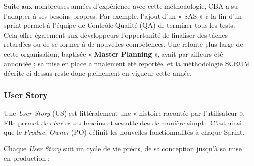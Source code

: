 \documentclass{article}
\begin{document}
Suite aux nombreuses années d'expérience avec cette méthodologie, CBA a su l'adapter à ses besoins propres. Par exemple, l'ajout d'un « SAS » à la fin d'un sprint permet à l'équipe de Contrôle Qualité (QA) de terminer tous les tests. Cela offre également aux développeurs l'opportunité de finaliser des tâches retardées ou de se former à de nouvelles compétences. Une refonte plus large de cette organisation, baptisée « \textbf{Master Planning} », avait par ailleurs été annoncée ; sa mise en place a finalement été reportée, et la méthodologie SCRUM décrite ci-dessus reste donc pleinement en vigueur cette année.

\subsubsection{User Story}

Une \textit{User Story} (US) est littéralement une « histoire racontée par l'utilisateur ». Elle permet de décrire ses besoins et ses attentes de manière simple. C'est ainsi que le \textit{Product Owner} (PO) définit les nouvelles fonctionnalités à chaque Sprint.

Chaque \textit{User Story} suit un cycle de vie précis, de sa conception jusqu'à sa mise en production :
\end{document}
